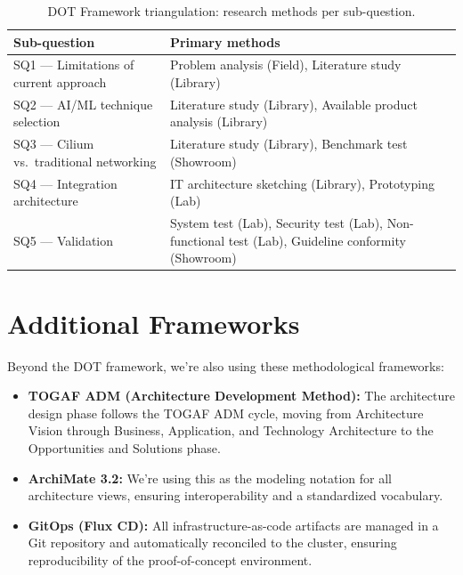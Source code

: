 \begin{table}[H]
\centering
\caption{DOT Framework triangulation: research methods per sub-question.}
\label{tab:triangulation}
\begin{tabular}{@{}p{5.5cm}p{8cm}@{}}
\toprule
\textbf{Sub-question} & \textbf{Primary methods} \\
\midrule
SQ1 --- Limitations of current approach & Problem analysis (Field), Literature study (Library) \\
SQ2 --- AI/ML technique selection       & Literature study (Library), Available product analysis (Library) \\
SQ3 --- Cilium vs.\ traditional networking & Literature study (Library), Benchmark test (Showroom) \\
SQ4 --- Integration architecture        & IT architecture sketching (Library), Prototyping (Lab) \\
SQ5 --- Validation                      & System test (Lab), Security test (Lab), Non-functional test (Lab), Guideline conformity (Showroom) \\
\bottomrule
\end{tabular}
\end{table}

\section{Additional Frameworks}

Beyond the DOT framework, we're also using these methodological frameworks:

\begin{itemize}
    \item \textbf{TOGAF ADM (Architecture Development Method):} The architecture design phase follows the TOGAF ADM cycle, moving from Architecture Vision through Business, Application, and Technology Architecture to the Opportunities and Solutions phase.
    \item \textbf{ArchiMate 3.2:} We're using this as the modeling notation for all architecture views, ensuring interoperability and a standardized vocabulary.
    \item \textbf{GitOps (Flux CD):} All infrastructure-as-code artifacts are managed in a Git repository and automatically reconciled to the cluster, ensuring reproducibility of the proof-of-concept environment.
\end{itemize}
